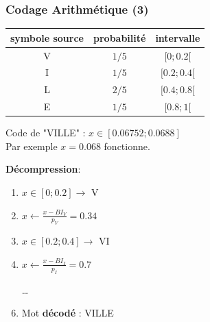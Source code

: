 \documentclass{beamer}
\begin{document}
\begin{frame}
    \frametitle{Codage Arithmétique (3)}

    {
    \centering
    \begin{tabular}{c | c | c}
        symbole source & probabilité & intervalle  \\
        \hline
        V & $1/5$ & $[0; 0.2[$ \\ 
        I & $1/5$ & $[0.2; 0.4[$\\
        L & $2/5$ & $[0.4; 0.8[$\\
        E & $1/5$ & $[0.8; 1[$\\ \hline
    \end{tabular}\par
    }

    \vspace*{1em}

    Code de "VILLE" : $x \in [0.06752 ; 0.0688]$ \\
    Par exemple $x = 0.068$ fonctionne.

    \vspace*{1em}

    \textbf{Décompression}: \\
    \begin{enumerate}
        \item $x \in [0; 0.2] \rightarrow$ V
        \item $x \leftarrow \frac{x - BI_V}{p_V} = 0.34$
        \item $x \in [0.2; 0.4] \rightarrow$ VI
        \item $x \leftarrow \frac{x - BI_I}{p_I} = 0.7$
        \item [\dots] 
        \item Mot \textbf{décodé} : VILLE
    \end{enumerate}

\end{frame}
\end{document}
